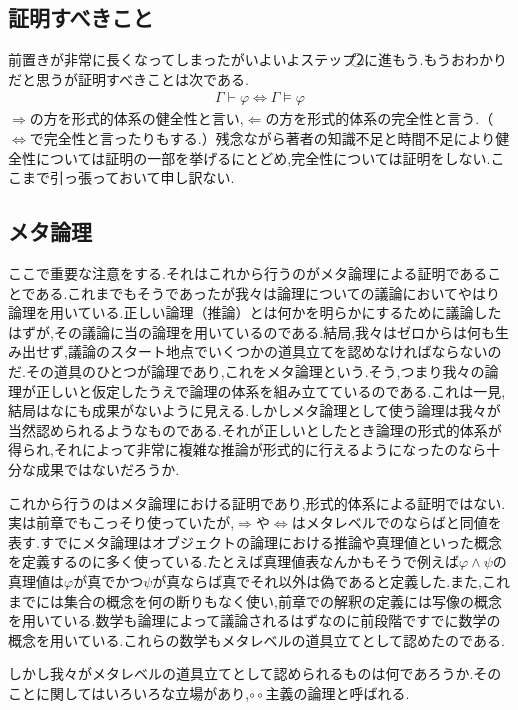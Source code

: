 \documentclass[10pt,b5paper,papersize,dvipdfmx]{jsbook}
\begin{document}
\subsection{証明すべきこと}
前置きが非常に長くなってしまったがいよいよステップ\textcircled{\scriptsize 2}に進もう.もうおわかりだと思うが証明すべきことは次である.
\begin{align}
\Gamma \vdash \varphi \Leftrightarrow \Gamma \models \varphi
\end{align}
$\Rightarrow$の方を形式的体系の健全性と言い,$\Leftarrow$の方を形式的体系の完全性と言う.（$\Leftrightarrow$で完全性と言ったりもする.）残念ながら著者の知識不足と時間不足により健全性については証明の一部を挙げるにとどめ,完全性については証明をしない.ここまで引っ張っておいて申し訳ない.
\subsection{メタ論理}
ここで重要な注意をする.それはこれから行うのがメタ論理による証明であることである.これまでもそうであったが我々は論理についての議論においてやはり論理を用いている.正しい論理（推論）とは何かを明らかにするために議論したはずが,その議論に当の論理を用いているのである.結局,我々はゼロからは何も生み出せず,議論のスタート地点でいくつかの道具立てを認めなければならないのだ.その道具のひとつが論理であり,これをメタ論理という.そう,つまり我々の論理が正しいと仮定したうえで論理の体系を組み立てているのである.これは一見,結局はなにも成果がないように見える.しかしメタ論理として使う論理は我々が当然認められるようなものである.それが正しいとしたとき論理の形式的体系が得られ,それによって非常に複雑な推論が形式的に行えるようになったのなら十分な成果ではないだろうか.\par
これから行うのはメタ論理における証明であり,形式的体系による証明ではない.実は前章でもこっそり使っていたが,$\Rightarrow$や$\Leftrightarrow$はメタレベルでのならばと同値を表す.すでにメタ論理はオブジェクトの論理における推論や真理値といった概念を定義するのに多く使っている.たとえば真理値表なんかもそうで例えば$\varphi \land \psi$の真理値は$\varphi$が真でかつ$\psi$が真ならば真でそれ以外は偽であると定義した.また,これまでには集合の概念を何の断りもなく使い,前章での解釈の定義には写像の概念を用いている.数学も論理によって議論されるはずなのに前段階ですでに数学の概念を用いている.これらの数学もメタレベルの道具立てとして認めたのである.\par
しかし我々がメタレベルの道具立てとして認められるものは何であろうか.そのことに関してはいろいろな立場があり,$\circ \circ$主義の論理と呼ばれる.\par
\end{document}
